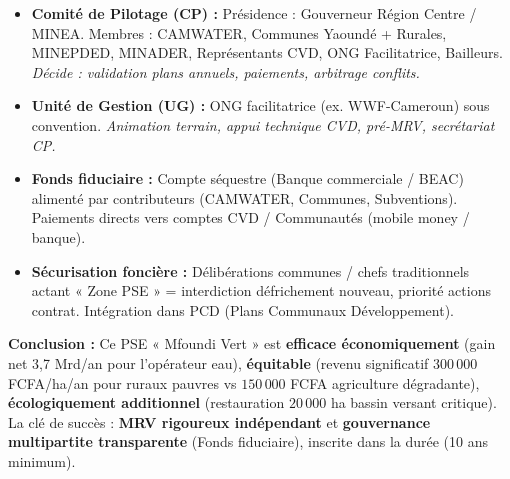 \documentclass[11pt]{article}
\begin{document}
\begin{exoresolu}
\begin{enumerate}
\begin{itemize}
            \item \textbf{Comité de Pilotage (CP) :} Présidence : Gouverneur Région Centre / MINEA. Membres : CAMWATER, Communes Yaoundé + Rurales, MINEPDED, MINADER, Représentants CVD, ONG Facilitatrice, Bailleurs. \textit{Décide : validation plans annuels, paiements, arbitrage conflits.}
            \item \textbf{Unité de Gestion (UG) :} ONG facilitatrice (ex. WWF-Cameroun) sous convention. \textit{Animation terrain, appui technique CVD, pré-MRV, secrétariat CP.}
            \item \textbf{Fonds fiduciaire :} Compte séquestre (Banque commerciale / BEAC) alimenté par contributeurs (CAMWATER, Communes, Subventions). Paiements directs vers comptes CVD / Communautés (mobile money / banque).
            \item \textbf{Sécurisation foncière :} Délibérations communes / chefs traditionnels actant « Zone PSE » = interdiction défrichement nouveau, priorité actions contrat. Intégration dans PCD (Plans Communaux Développement).
        \end{itemize}
    \end{enumerate}
    \textbf{Conclusion :} Ce PSE « Mfoundi Vert » est \textbf{efficace économiquement} (gain net 3,7 Mrd/an pour l'opérateur eau), \textbf{équitable} (revenu significatif $300\,000$ FCFA/ha/an pour ruraux pauvres vs $150\,000$ FCFA agriculture dégradante), \textbf{écologiquement additionnel} (restauration $20\,000$ ha bassin versant critique). La clé de succès : \textbf{MRV rigoureux indépendant} et \textbf{gouvernance multipartite transparente} (Fonds fiduciaire), inscrite dans la durée (10 ans minimum).
\end{exoresolu}
\end{document}
